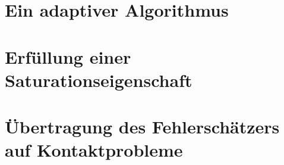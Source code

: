 \section{Ein adaptiver Algorithmus}
\label{kap:4.2}



\section{Erfüllung einer Saturationseigenschaft}
\label{kap:4.3}



\section{Übertragung des Fehlerschätzers auf Kontaktprobleme}
\label{kap:4.4}


\newpage

